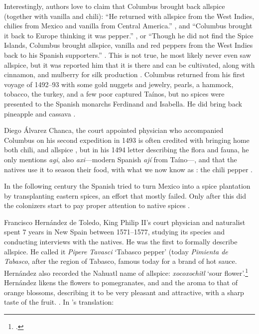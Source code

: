 Interestingly, authors love to claim that Columbus brought back allspice (together with vanilla and chili): ``He returned with allspice from the West Indies, chilies from Mexico and vanilla from Central America.'' \autocite[17]{craze_spice_1997}, and ``Columbus brought it back to Europe thinking it was pepper.'' \autocite[146]{czarra_spices_2009}, or ``Though he did not find the Spice Islands, Columbus brought allspice, vanilla and red peppers from the West Indies back to his Spanish supporters.'' \autocite[1]{parthasarathy_chemistry_2008}. This is not true, he most likely never even saw allspice, but it was reported him that it is there and can be cultivated, along with cinnamon, and mulberry for silk production \autocites[151]{colon_life_1959}. Columbus returned from his first voyage of 1492--93 with some gold nuggets and jewelry, pearls, a hammock, tobacco, the turkey, and a few poor captured Taínos, but no spices were presented to the Spanish monarchs Ferdinand and Isabella. He did bring back pineapple and cassava \autocite[11]{turner_spice_2004}. 

Diego Álvarez Chanca, the court appointed physician who accompanied Columbus on his second expedition in 1493 is often credited with bringing home both chili, and allspice \autocites[]{mccormick_history_nodate}, but in his 1494 letter describing the flora and fauna, he only mentions \textit{agi}, also \textit{axi}---modern Spanish \textit{ají} from Taíno---\autocite[see][34]{corominas_breve_1987}, and that the natives use it to season their food, with what we now know as : the chili pepper \autocite[311]{chanca_american_2003}.

In the following century the Spanish tried to turn Mexico into a spice plantation by transplanting eastern spices, an effort that mostly failed. Only after this did the colonizers start to pay proper attention to native spices \autocite[6]{machuca_past_2020}. 

Francisco Hernández de Toledo, King Philip II's court physician and naturalist spent 7 years in New Spain between 1571--1577, studying its species and conducting interviews with the natives. He was the first to formally describe allspice. He called it \textit{Pipere Tavasci} `Tabasco pepper' (today \textit{Pimienta de Tabasco}, after the region of Tabasco, famous today for a brand of hot sauce. Hernández also recorded the Nahuatl name of allspice: \textit{xocoxochitl} `sour flower'.\footcite[cf.][xococ; xochitl]{ond} Hernández likens the flowers to pomegranates, and and the aroma to that of orange blossoms, describing it to be very pleasant and attractive, with a sharp taste of the fruit. \autocite[2]{hernandez_cuatro_1615}. In \textcite{machuca_past_2020}'s translation:

